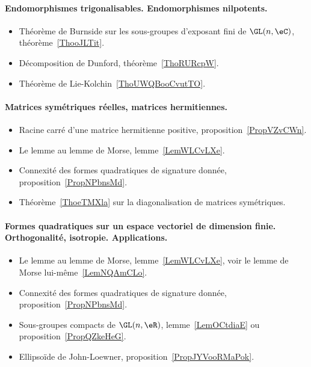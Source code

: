 \paragraph{Endomorphismes trigonalisables. Endomorphismes nilpotents.}
\begin{itemize}
    \item Théorème de Burnside sur les sous-groupes d'exposant fini de \( \GL(n,\eC)\), théorème~\ref{ThooJLTit}.
    \item Décomposition de Dunford, théorème~\ref{ThoRURcpW}.
    \item Théorème de Lie-Kolchin~\ref{ThoUWQBooCvutTO}.
\end{itemize}
\paragraph{Matrices symétriques réelles, matrices hermitiennes.}
\begin{itemize}
    \item Racine carré d'une matrice hermitienne positive, proposition~\ref{PropVZvCWn}.
    \item Le lemme au lemme de Morse, lemme~\ref{LemWLCvLXe}.
    \item Connexité des formes quadratiques de signature donnée, proposition~\ref{PropNPbnsMd}.
    \item Théorème~\ref{ThoeTMXla} sur la diagonalisation de matrices symétriques.
\end{itemize}
\paragraph{Formes quadratiques sur un espace vectoriel de dimension finie. Orthogonalité, isotropie. Applications.}
\begin{itemize}
    \item Le lemme au lemme de Morse, lemme~\ref{LemWLCvLXe}, voir le lemme de Morse lui-même~\ref{LemNQAmCLo}.
    \item Connexité des formes quadratiques de signature donnée, proposition~\ref{PropNPbnsMd}.
    \item Sous-groupes compacts de \( \GL(n,\eR)\), lemme~\ref{LemOCtdiaE} ou proposition~\ref{PropQZkeHeG}.
    \item Ellipsoïde de John-Loewner, proposition~\ref{PropJYVooRMaPok}.
\end{itemize}
